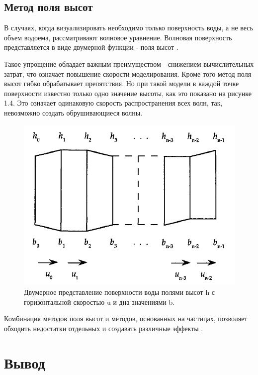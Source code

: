 \subsection{Метод поля высот}

В случаях, когда визуализировать необходимо только поверхность воды, а не весь объем водоема, рассматривают волновое уравнение. Волновая поверхность представляется в виде двумерной функции - поля высот \cite{field}. 

Такое упрощение обладает важным преимуществом - снижением вычислительных затрат, что означает повышение скорости моделирования. Кроме того метод поля высот гибко обрабатывает препятствия. Но при такой модели в каждой точке поверхности известно только одно значение высоты, как это показано на рисунке 1.4. Это означает одинаковую скорость распространения всех волн, так, невозможно создать обрушивающиеся волны.

\begin{figure}[H]
	\begin{center}
		\includegraphics[scale=0.3]{img/height-field.png}
	\end{center}
	\captionsetup{justification=centering}
	\caption{Двумерное представление поверхности воды полями высот h с горизонтальной скоростью u и дна значениями b. }
	\label{img:height-field}
\end{figure}

Комбинация методов поля высот и методов, основанных на частицах, позволяет обходить недостатки отдельных и создавать различные эффекты \cite{shallow}\cite{large-small}.

\section*{Вывод}

